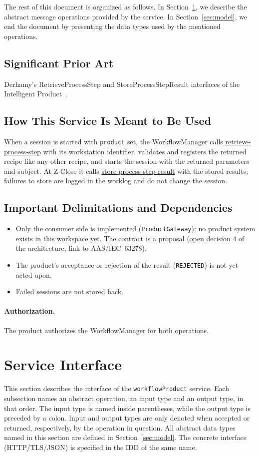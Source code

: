 \documentclass[a4paper]{arrowhead}
\newcommand{\oref}[1]{{\textcolor{ArrowheadBlue}{\hyperref[sec:operations:#1]{#1}}}}
\begin{document}
The rest of this document is organized as follows.
In Section~\ref{sec:operations}, we describe the abstract message operations provided by the service.
In Section~\ref{sec:model}, we end the document by presenting the data types used by the mentioned operations.

\subsection{Significant Prior Art}
Derhamy's RetrieveProcessStep and StoreProcessStepResult interfaces of the Intelligent
Product~\cite{derhamy2018workflow}.

\subsection{How This Service Is Meant to Be Used}
When a session is started with \texttt{product} set, the WorkflowManager calls \oref{retrieve-process-step}
with its workstation identifier, validates and registers the returned recipe like any other recipe, and starts the
session with the returned parameters and subject. At Z-Close it calls \oref{store-process-step-result} with the stored
results; failures to store are logged in the worklog and do not change the session.

\subsection{Important Delimitations and Dependencies}
\label{sec:delimitations}
\begin{itemize}
\item Only the consumer side is implemented (\texttt{ProductGateway}); no product system exists in this workspace yet. The contract is a proposal (open decision 4 of the architecture, link to AAS/IEC~63278).
\item The product's acceptance or rejection of the result (\texttt{REJECTED}) is not yet acted upon.
\item Failed sessions are not stored back.
\end{itemize}

\paragraph{Authorization.} The product authorizes the WorkflowManager for both operations.

\newpage
\section{Service Interface}
\label{sec:operations}
This section describes the interface of the \texttt{workflowProduct} service. Each subsection names an abstract operation,
an input type and an output type, in that order. The input type is named inside parentheses, while the output type is
preceded by a colon. Input and output types are only denoted when accepted or returned, respectively, by the operation
in question. All abstract data types named in this section are defined in Section~\ref{sec:model}. The concrete
interface (HTTP/TLS/JSON) is specified in the IDD of the same name.
\end{document}

